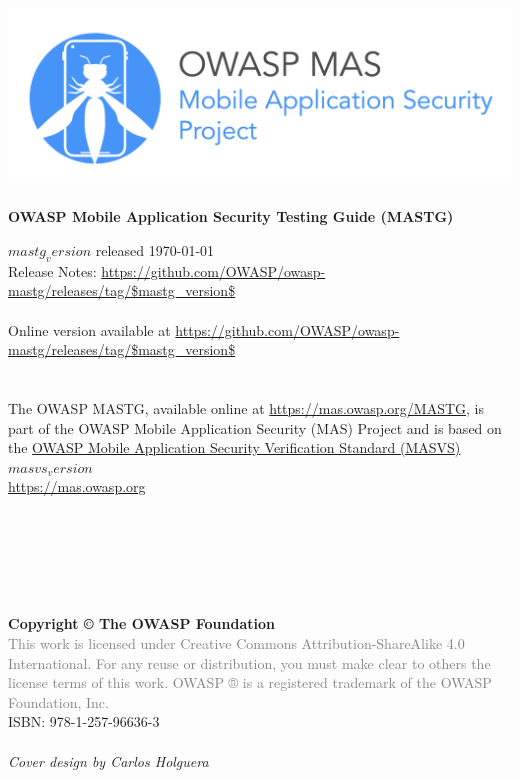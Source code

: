 \thispagestyle{empty} %

\includegraphics[width=\textwidth]{Document/Images/owasp_mas_header.png} \\ \\

\large{\textbf{OWASP Mobile Application Security Testing Guide (MASTG)} }

$mastg_version$ released \today \\

Release Notes: \url{https://github.com/OWASP/owasp-mastg/releases/tag/$mastg_version$} \\ \\

Online version available at \url{https://github.com/OWASP/owasp-mastg/releases/tag/$mastg_version$} \\ \\ \\


The OWASP MASTG, available online at \url{https://mas.owasp.org/MASTG}, is part of the OWASP Mobile Application Security (MAS) Project and is based on the \href{https://mas.owasp.org/MASVS}{OWASP Mobile Application Security Verification Standard (MASVS) $masvs_version$} \\

\url{https://mas.owasp.org} \\ \\ \\ \\ \\ \\ \\

\textbf{Copyright © The OWASP Foundation} \\

\footnotesize{\textcolor{gray}{This work is licensed under Creative Commons Attribution-ShareAlike 4.0 International. For any reuse or distribution, you must make clear to others the license terms of this work.
OWASP ® is a registered trademark of the OWASP Foundation, Inc.} }\\

ISBN: 978-1-257-96636-3 \\ \\

\emph{Cover design by Carlos Holguera}